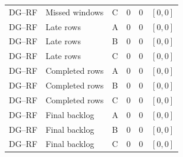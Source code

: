 \begin{longtable}{lllrrr}
DG--RF & Missed windows & C & 0 & 0 & $[0,0]$\\
DG--RF & Late rows & A & 0 & 0 & $[0,0]$\\
DG--RF & Late rows & B & 0 & 0 & $[0,0]$\\
DG--RF & Late rows & C & 0 & 0 & $[0,0]$\\
DG--RF & Completed rows & A & 0 & 0 & $[0,0]$\\
DG--RF & Completed rows & B & 0 & 0 & $[0,0]$\\
DG--RF & Completed rows & C & 0 & 0 & $[0,0]$\\
DG--RF & Final backlog & A & 0 & 0 & $[0,0]$\\
DG--RF & Final backlog & B & 0 & 0 & $[0,0]$\\
DG--RF & Final backlog & C & 0 & 0 & $[0,0]$\\
\end{longtable}\normalsize
